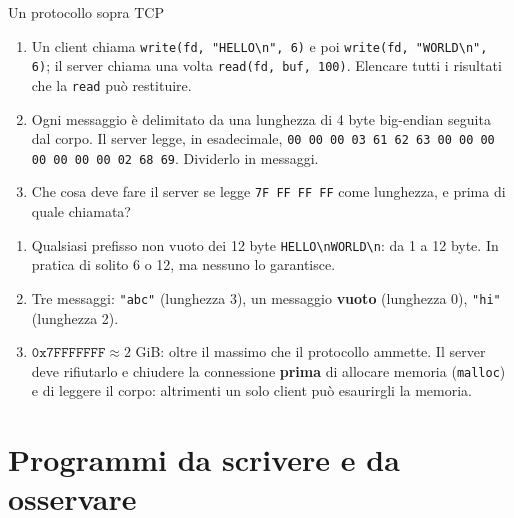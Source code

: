 \begin{esercizio}{Un protocollo sopra TCP}
\begin{enumerate}[label=(\alph*)]
    \item Un client chiama \texttt{write(fd, "HELLO\textbackslash n", 6)} e poi \texttt{write(fd, "WORLD\textbackslash n", 6)}; il server
          chiama una volta \texttt{read(fd, buf, 100)}. Elencare tutti i risultati che la \texttt{read} può restituire.
    \item Ogni messaggio è delimitato da una lunghezza di 4 byte big-endian seguita dal corpo. Il server legge, in esadecimale,
          \texttt{00 00 00 03 61 62 63 00 00 00 00 00 00 00 02 68 69}. Dividerlo in messaggi.
    \item Che cosa deve fare il server se legge \texttt{7F FF FF FF} come lunghezza, e prima di quale chiamata?
\end{enumerate}

\svolgimento
\begin{enumerate}[label=(\alph*)]
    \item Qualsiasi prefisso non vuoto dei 12 byte \texttt{HELLO\textbackslash nWORLD\textbackslash n}: da 1 a 12 byte. In pratica di solito
          6 o 12, ma nessuno lo garantisce.
    \item Tre messaggi: \texttt{"abc"} (lunghezza 3), un messaggio \textbf{vuoto} (lunghezza 0), \texttt{"hi"} (lunghezza 2).
    \item $\texttt{0x7FFFFFFF} \approx 2$ GiB: oltre il massimo che il protocollo ammette. Il server deve rifiutarlo e chiudere la connessione
          \textbf{prima} di allocare memoria (\texttt{malloc}) e di leggere il corpo: altrimenti un solo client può esaurirgli la memoria.
\end{enumerate}
\end{esercizio}

\section{Programmi da scrivere e da osservare}

